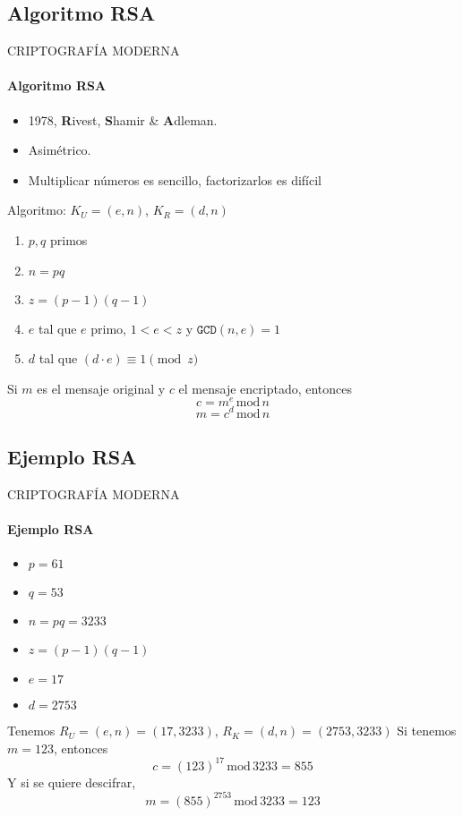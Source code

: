 \subsection{Algoritmo RSA}
\begin{frame}{CRIPTOGRAFÍA MODERNA}
\framesubtitle{Algoritmo RSA}
	\begin{itemize}
	\item 1978, \textbf{R}ivest, \textbf{S}hamir \& \textbf{A}dleman.
    \item Asimétrico.
    \item Multiplicar números es sencillo, factorizarlos es difícil
	\end{itemize}
    Algoritmo: $K_U = (e,n)$, $K_R = (d,n)$
    \begin{enumerate}
    \item $p,q$ primos
    \item $n = pq$
    \item $z = (p-1)(q-1)$
    \item $e$ tal que $e$ primo, $1<e<z$ y $\texttt{GCD}(n,e) = 1$
    \item $d$ tal que $(d \cdot e) \equiv 1 \pmod{z}$
    \end{enumerate}
    Si $m$ es el mensaje original y $c$ el mensaje encriptado, entonces
    \begin{equation*}
    	c = m^e\hspace{2pt}\text{mod}\hspace{2pt} n
    \end{equation*}
    \begin{equation*}
    	m = c^d\hspace{2pt}\text{mod}\hspace{2pt} n
    \end{equation*}
\end{frame}
\subsection{Ejemplo RSA}
\begin{frame}{CRIPTOGRAFÍA MODERNA}
	\framesubtitle{Ejemplo RSA}
    \begin{itemize}
    \item $p=61$
    \item $q=53$
    \item $n=pq=3233$
    \item $z=(p-1)(q-1)$
    \item $e = 17$
    \item $d = 2753$
    \end{itemize}
    Tenemos $R_U = (e,n)=(17,3233)$, $R_K = (d,n) = (2753,3233)$
    Si tenemos $m = 123$, entonces
    \begin{equation*}
    	c = (123)^{17}\hspace{2pt}\text{mod}\hspace{2pt} 3233 = 855
  	\end{equation*}
    Y si se quiere descifrar,
    \begin{equation*}
    	m = (855)^{2753}\hspace{2pt}\text{mod}\hspace{2pt} 3233 = 123
    \end{equation*}
\end{frame}
